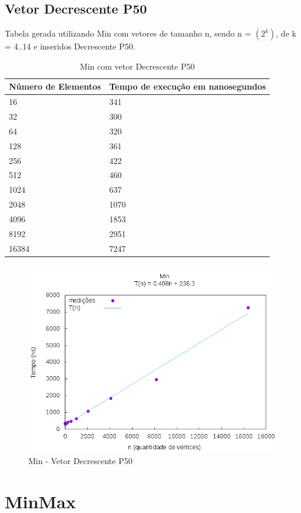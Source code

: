 \documentclass[12pt,a4paper,twoside]{report}
\begin{document}
\subsection{Vetor Decrescente P50}
Tabela gerada utilizando Min com vetores de tamanho n, sendo n = $(2^k)$, de k = 4..14 e inseridos Decrescente P50.
\begin{table}[H]
\centering
\caption{Min com vetor Decrescente P50}
\label{my-label}
\begin{tabular}{|l|l|}
\hline
\multicolumn{1}{|c|}{\textbf{Número de Elementos}} & \multicolumn{1}{c|}{\textbf{Tempo de execução em nanosegundos}} \\ \hline
16 & 341 \\ \hline
32 & 300 \\ \hline
64 & 320 \\ \hline
128 & 361 \\ \hline
256 & 422 \\ \hline
512 & 460 \\ \hline
1024 & 637 \\ \hline
2048 & 1070 \\ \hline
4096 & 1853 \\ \hline
8192 & 2951 \\ \hline
16384 & 7247 \\ \hline
\end{tabular}
\end{table}

\begin{figure}[H]
    \centering
    \includegraphics[width=0.7\linewidth]{graficos/Min/Decrescente P50/Min.png}
  \caption{Min - Vetor Decrescente P50}
\end{figure}




\section{MinMax}
\end{document}

